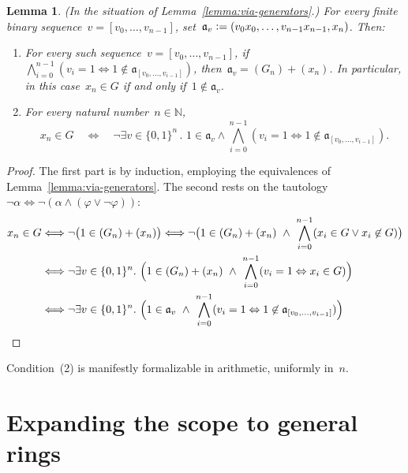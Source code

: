 \documentclass[com,11pt,crcready]{iosart2x}
\theoremstyle{definition}
\theoremstyle{plain}
\newtheorem{lemma}[definition]{Lemma}
\theoremstyle{remark}
\newcommand{\?}{\,{:}\,}
\newcommand{\aaa}{\mathfrak{a}}
\newcommand{\NN}{\mathbb{N}}
\newcommand{\defeq}{\vcentcolon=}
\renewcommand{\_}{\mathpunct{.}\,}
\begin{document}
\begin{lemma}\label{lemma:uniform-char}(In the situation of Lemma~\ref{lemma:via-generators}.)
For every finite binary sequence~$v = [v_0,\ldots,v_{n-1}]$, set~$\aaa_v
\defeq (v_0x_0,\ldots,v_{n-1}x_{n-1},x_n)$. Then:
\begin{enumerate}
\item For every such sequence~$v = [v_0,\ldots,v_{n-1}]$, if
$\bigwedge_{i=0}^{n-1} (v_i = 1 \Leftrightarrow 1 \not\in \aaa_{[v_0,\ldots,v_{i-1}]})$,
then~$\aaa_v = (G_n) + (x_n)$.
In particular, in this case~$x_n \in G$ if and only if~$1 \not\in \aaa_v$.
\item For every natural number~$n \in \NN$,
\vspace*{-1.2em}
\[ x_n \in G \quad\Longleftrightarrow\quad \neg
  \exists v \in \{0,1\}^n\_
    1 \in \aaa_v \wedge
      \bigwedge_{i=0}^{n-1} (v_i = 1 \Leftrightarrow 1 \not\in \aaa_{[v_0,\ldots,v_{i-1}]}). \]
\end{enumerate}
\end{lemma}

\begin{proof}\belowdisplayskip=-18pt The first part is by induction, employing the equivalences of
Lemma~\ref{lemma:via-generators}. The second rests on the tautology
$\neg\alpha \Longleftrightarrow \neg(\alpha \wedge (\varphi \vee \neg\varphi))$:
\begin{align*}
  x_n \in G &
  \Longleftrightarrow \neg\bigl(1 \in (G_n) + (x_n)\bigr)
  \Longleftrightarrow \neg\bigl(1 \in (G_n) + (x_n) \ \wedge\ \bigwedge_{i=0}^{n-1} (x_i \in G \vee x_i \not\in G)\bigr) \\
  & \Longleftrightarrow \neg\exists v \in \{0,1\}^n\_
    \Bigl(1 \in (G_n) + (x_n) \ \wedge\ \bigwedge_{i=0}^{n-1} (v_i = 1
    \Leftrightarrow x_i \in G)\Bigr) \\
  & \Longleftrightarrow \neg\exists v \in \{0,1\}^n\_
    \Bigl(1 \in \aaa_v \ \wedge\ \bigwedge_{i=0}^{n-1} (v_i = 1
    \Leftrightarrow 1 \not\in \aaa_{[v_0,\ldots,v_{i-1}]})\Bigr)
\end{align*}
\end{proof}

\noindent
Condition~(2) is manifestly formalizable in
arithmetic, uniformly in~$n$.


\section{Expanding the scope to general rings}
\label{sect:wlog}
\end{document}

